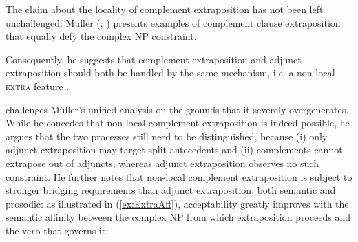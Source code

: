 \documentclass[output=paper
                ,modfonts
                ,nonflat
	        ,collection
	        ,collectionchapter
	        ,collectiontoclongg
 	        ,biblatex
                ,babelshorthands
                ,newtxmath
                ,draftmode
                ,colorlinks, citecolor=brown
]{./langsci/langscibook}
\begin{document}
{\begin{figure}
\end{figure}

The claim about the locality of complement extraposition has not been
left unchallenged: Müller (\citeyear[]{Mueller99a};
\citeyear[]{Mueller2004d}) presents examples of complement
clause extraposition that equally defy the complex NP constraint.

 \begin{exe}
  \ex 
  \begin{xlist}
    
    
  \end{xlist}
\end{exe}

Consequently, he suggests that complement extraposition and adjunct
extraposition should both be handled by the same mechanism, i.e. a
non-local \textsc{extra} feature \citep{Keller:95,Mueller99a}.

\citet{crysmann_b09xtra} challenges Müller's unified analysis on the
grounds that it severely overgenerates.  While he concedes that
non-local complement extraposition is indeed possible, he argues that
the two processes still need to be distinguished, because (i) only
adjunct extraposition may target split antecedents and (ii)
complements cannot extrapose out of adjuncts, whereas adjunct
extraposition observes no such constraint.  He further notes that
non-local complement extraposition is subject to stronger bridging
requirements than adjunct extraposition, both semantic and prosodic:
as illustrated in (\ref{ex:ExtraAff}), acceptability greatly improves
with the semantic affinity between the complex NP from which
extraposition proceeds and the verb that governs it.

}
\end{document}
